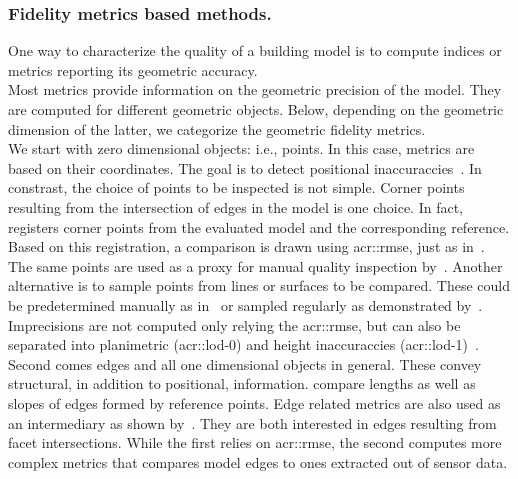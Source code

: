         \subsubsection{Fidelity metrics based methods.}
            One way to characterize the quality of a building model is to compute indices or metrics reporting its geometric accuracy.\\

            Most metrics provide information on the geometric precision of the model.
            They are computed for different geometric objects.
            Below, depending on the geometric dimension of the latter, we categorize the geometric fidelity metrics.\\

            We start with zero dimensional objects: i.e., points.
            In this case, metrics are based on their coordinates.
            The goal is to detect positional inaccuraccies~\parencite{kaartinen2005accuracy}.
            In constrast, the choice of points to be inspected is not simple.
            Corner points resulting from the intersection of edges in the model is one choice.
            In fact,~\textcite{zeng2014multicriteria} registers corner points from the evaluated model and the corresponding reference.
            Based on this registration, a comparison is drawn using \acrfull{acr::rmse}, just as in~\parencite{you2011quality,landes2012quality}.
            The same points are used as a proxy for manual quality inspection by~\textcite{elberink2011quality}.
            Another alternative is to sample points from lines or surfaces to be compared.
            These could be predetermined manually as in~\parencite{kaartinen2005accuracy} or sampled regularly as demonstrated by~\textcite{vogtle2003quality,tran2019geometric}.
            Imprecisions are not computed only relying the \gls{acr::rmse}, but can also be separated into planimetric (\gls{acr::lod}-0) and height inaccuraccies (\gls{acr::lod}-1)~\parencite{vogtle2003quality,jaynes2003recognition,kaartinen2005accuracy}.\\

            Second comes edges and all one dimensional objects in general.
            These convey structural, in addition to positional, information.
            \textcite{kaartinen2005accuracy} compare lengths as well as slopes of edges formed by reference points.
            Edge related metrics are also used as an intermediary as shown by~\textcite{elberink2011quality,michelin2013quality}.
            They are both interested in edges resulting from facet intersections.
            While the first relies on \gls{acr::rmse}, the second computes more complex metrics that compares model edges to ones extracted out of sensor data.\\

